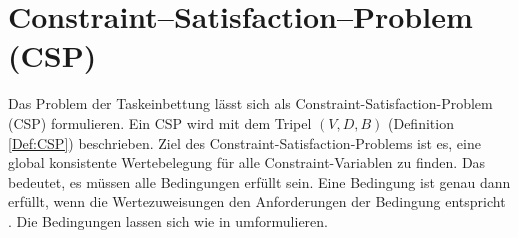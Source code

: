 
\section{Constraint--Satisfaction--Problem (CSP)}

Das Problem der Taskeinbettung lässt sich als Constraint-Satisfaction-Problem (CSP) formulieren. Ein CSP wird mit dem Tripel $(V, D, B)$ (Definition \ref{Def:CSP})  beschrieben. Ziel des Constraint-Satisfaction-Problems ist es, eine global konsistente Wertebelegung für alle Constraint-Variablen zu finden. Das bedeutet, es müssen alle Bedingungen erfüllt sein. Eine Bedingung ist genau dann erfüllt, wenn die Wertezuweisungen den Anforderungen der Bedingung entspricht \cite{handbuchkuenstlicheIntelligenz}. Die Bedingungen lassen sich wie in \cite{jaeger}  umformulieren. \\
\\

